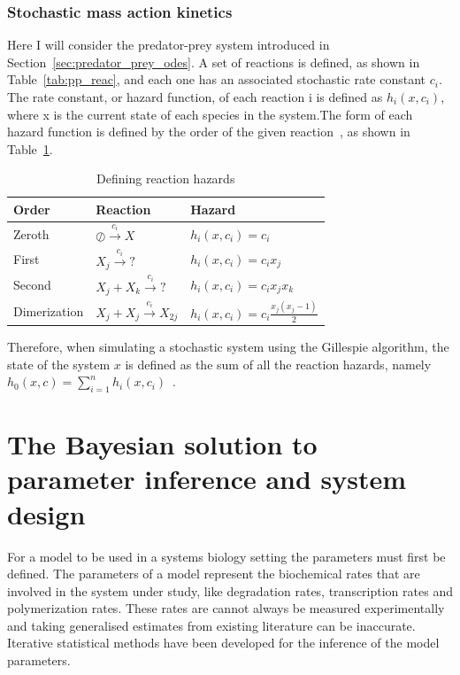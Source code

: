 \subsubsection{Stochastic mass action kinetics}
Here I will consider the predator-prey system introduced in Section~\ref{sec:predator_prey_odes}. A set of reactions is defined, as shown in Table~\ref{tab:pp_reac}, and each one has an associated stochastic rate constant $c_i$. The rate constant, or hazard function, of each reaction i is defined as $h_i(x, c_i)$, where x is the current state of each species in the system.The form of each hazard function is defined by the order of the given reaction~\autocite{Wilkinson:2006td}, as shown in Table~\ref{tab:hazards}. 


\begin{table}[h]
\centering
\caption{Defining reaction hazards}
\label{tab:hazards}
\begin{tabular}{@{}lll@{}}
\toprule
Order & Reaction & Hazard \\ \midrule
Zeroth & $\oslash \xrightarrow{c_i}X $ & $h_i(x, c_i) = c_i$ \\
First & $X_j \xrightarrow{c_i} ? $ & $h_i(x, c_i) = c_{i}x_j$ \\
Second & $X_j + X_k \xrightarrow{c_i} ? $ & $h_i(x, c_i) = c_{i}x_{j}x_k$ \\
Dimerization & $X_j + X_j \xrightarrow{c_i} X_{2j} $ & $h_i(x, c_i) = c_{i}\frac{x_{j}(x_{j}-1)}{2}$ \\ \bottomrule
\end{tabular}
\end{table}

\noindent Therefore, when simulating a stochastic system using the Gillespie algorithm, the state of the system $x$ is defined as the sum of all the reaction hazards, namely $h_0(x, c) = \sum_{i=1}^{n}h_{i}(x, c_i)$~\autocite{Wilkinson:2006td}. 

\section{The Bayesian solution to parameter inference and system design}

For a model to be used in a systems biology setting the parameters must first be defined. The parameters of a model represent the biochemical rates that are involved in the system under study, like degradation rates, transcription rates and polymerization rates. These rates are cannot always be measured experimentally and taking generalised estimates from existing literature can be inaccurate. Iterative statistical methods have been developed for the inference of the model parameters.

